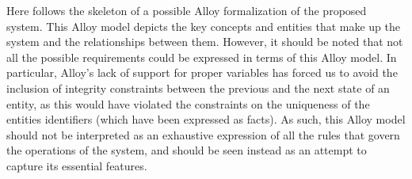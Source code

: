 Here follows the skeleton of a possible Alloy formalization of the proposed system.
This Alloy model depicts the key concepts and entities that make up the system and the relationships between them.
However, it should be noted that not all the possible requirements could be expressed in terms of this Alloy model. 
In particular, Alloy’s lack of support for proper variables has forced us to avoid the inclusion of integrity constraints between the previous and the next state of an entity, as this would have violated the constraints on the uniqueness of the entities identifiers (which have been expressed as facts). 
As such, this Alloy model should not be interpreted as an exhaustive expression of all the rules that govern the operations of the system, and should be seen instead as an attempt to capture its essential features. 
